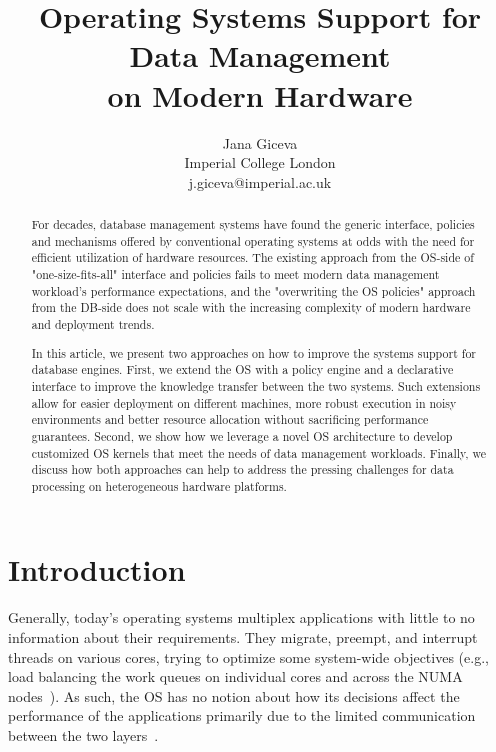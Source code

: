 \documentclass[11pt]{article}
\begin{document}
\title{Operating Systems Support for Data Management \\ on Modern Hardware}
\author{Jana Giceva \\ Imperial College London \\ j.giceva@imperial.ac.uk}
\maketitle

\begin{abstract}
For decades, database management systems have found the generic interface, policies and mechanisms offered by 
conventional operating systems at odds with the need for efficient utilization of hardware resources. The 
existing approach from the OS-side of "one-size-fits-all" interface and policies fails to meet modern data 
management workload's performance expectations, and the "overwriting the OS policies" approach from the 
DB-side does not scale with the increasing complexity of modern hardware and deployment trends.
 
In this article, we present two approaches on how to improve the systems support for database engines. First, 
we extend the OS with a policy engine and a declarative interface to improve the knowledge transfer between 
the two systems. Such extensions allow for easier deployment on different machines, more robust execution 
in noisy environments and better resource allocation without sacrificing performance guarantees. Second, 
we show how we leverage a novel OS architecture to develop customized OS kernels that meet the needs of 
data management workloads. Finally, we discuss how both approaches can help to address the pressing 
challenges for data processing on heterogeneous hardware platforms.
\end{abstract}

%

\section{Introduction}

Generally, today's operating systems multiplex applications with little to no information 
about their requirements. They migrate, preempt, and interrupt threads on various cores,
trying to optimize some system-wide objectives (e.g., load balancing the work queues
on individual cores and across the NUMA nodes~\cite{Lozi:eurosys16}). As such, the OS
has no notion about how its decisions affect the performance of the applications 
primarily due to the limited communication between the two layers~\cite{cod:2013}. 
\end{document}
